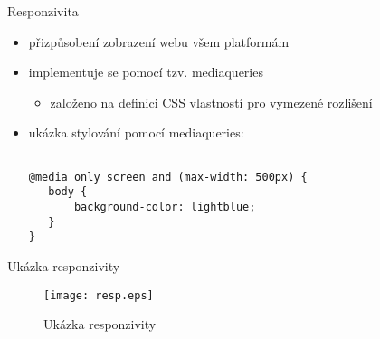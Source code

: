 \documentclass[fyma,pdf,final]{prosper}
\begin{document}
	\begin{slide}{Responzivita}
		\begin{itemize}
			\item přizpůsobení zobrazení webu všem platformám
			\item implementuje se pomocí tzv. mediaqueries
				\begin{itemize}
					\item založeno na definici CSS vlastností pro vymezené rozlišení
				\end{itemize}
			\item ukázka stylování pomocí mediaqueries:
\begin{lstlisting}[frame=single]  % Start your code-block

@media only screen and (max-width: 500px) {
   body {
       background-color: lightblue;
   }
}
\end{lstlisting}
		\end{itemize}
	\end{slide}
	\begin{slide}{Ukázka responzivity}
		\begin{figure}[h]
			\begin{center}
		        \texttt{[image: resp.eps]}
			    \caption{Ukázka responzivity}
			    \label{pic:responsivity}
			\end{center}
		\end{figure}
	\end{slide}
		
\end{document}
